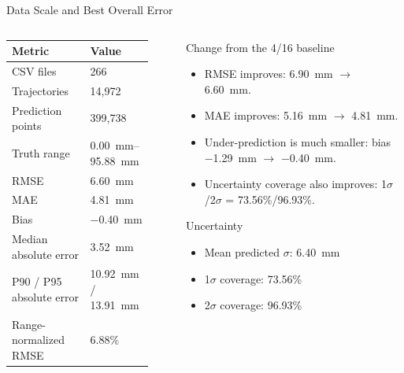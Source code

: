 \documentclass[aspectratio=169,11pt]{beamer}
\newcommand{\goodtext}[1]{\textcolor{green!45!black}{#1}}
\newcommand{\notetext}[1]{\textcolor{blue!65!black}{#1}}
\begin{document}
\begin{frame}{Data Scale and Best Overall Error}
\small
\begin{columns}[T,onlytextwidth]
\begin{column}{0.48\linewidth}
\begin{tabular}{L{0.55\linewidth}R{0.32\linewidth}}
\toprule
Metric & Value \\
\midrule
CSV files & 266 \\
Trajectories & 14,972 \\
Prediction points & 399,738 \\
Truth range & \SIrange{0.00}{95.88}{mm} \\
\midrule
RMSE & \SI{6.60}{mm} \\
MAE & \SI{4.81}{mm} \\
Bias & \SI{-0.40}{mm} \\
Median absolute error & \SI{3.52}{mm} \\
P90 / P95 absolute error & \SI{10.92}{mm} / \SI{13.91}{mm} \\
Range-normalized RMSE & 6.88\% \\
\bottomrule
\end{tabular}
\end{column}

\begin{column}{0.48\linewidth}
\begin{block}{Change from the 4/16 baseline}
\footnotesize
\begin{itemize}
  \item \goodtext{RMSE improves}: \SI{6.90}{mm} \(\rightarrow\) \SI{6.60}{mm}.
  \item \goodtext{MAE improves}: \SI{5.16}{mm} \(\rightarrow\) \SI{4.81}{mm}.
  \item \goodtext{Under-prediction is much smaller}: bias \SI{-1.29}{mm} \(\rightarrow\) \SI{-0.40}{mm}.
  \item \notetext{Uncertainty coverage also improves}: 1\(\sigma\)/2\(\sigma\) = 73.56\%/96.93\%.
\end{itemize}
\end{block}

\begin{block}{Uncertainty}
\footnotesize
\begin{itemize}
  \item Mean predicted \(\sigma\): \SI{6.40}{mm}
  \item 1\(\sigma\) coverage: 73.56\%
  \item 2\(\sigma\) coverage: 96.93\%
\end{itemize}
\end{block}
\end{column}
\end{columns}
\end{frame}
\end{document}
